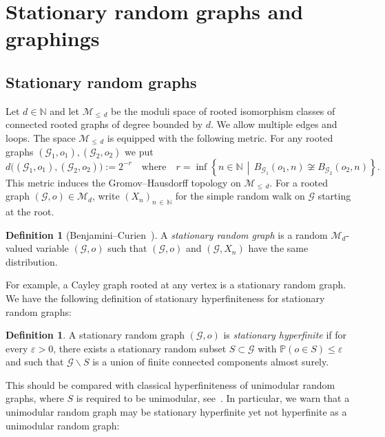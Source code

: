 \documentclass[10pt]{amsart}
\theoremstyle{definition}\newtheorem{defi}[theo]{Definition}\newtheorem{rema}[theo]{Remark}\newtheorem{exam}[theo]{Example}\newtheorem{exem}[theo]{Example}\newtheorem{nota}[theo]{Notation}
\newcommand{\bbN}{\mathbb{N}}
\newcommand{\bbP}{\mathbb{P}}
\newcommand{\calM}{\mathcal{M}}
\newcommand{\calG}{\mathcal{G}}
\begin{document}
\section{Stationary random graphs and graphings}\label{sec:stationary}

\subsection{Stationary random graphs}\label{sec:SRG}

Let $d\in\bbN$ and let $\calM_{\leq\,d}$ be the moduli space of rooted isomorphism classes of connected rooted graphs of degree bounded by $d$. We allow multiple edges and loops. The space $\calM_{\leq\,d}$ is equipped with the following metric. For any rooted graphs $(\calG_1,o_1),(\calG_2,o_2)$ we put
\[
d\big((\calG_1,o_1),(\calG_2,o_2)\big):=2^{-r} \quad\text{where}\quad r=\inf\left\{n\in\bbN \,\middle|\, B_{\calG_1}(o_1,n)\not\cong B_{\calG_2}(o_2,n)\right\}.
\]
This metric induces the Gromov--Hausdorff topology on $\calM_{\leq \,d}$. For a rooted graph $(\calG,o)\in \calM_d$, write $(X_n)_{n\,\in\,\bbN}$ for the simple random walk on $\calG$ starting at the root.

\begin{defi}[{Benjamini--Curien~\cite{BenCur}}]
A \emph{stationary random graph} is a random $\calM_d$-valued variable $(\calG,o)$ such that $(\calG,o)$ and $(\calG,X_n)$ have the same distribution.
\end{defi}


For example, a Cayley graph rooted at any vertex is a stationary random graph. We have the following definition of stationary hyperfiniteness for stationary random graphs:

\begin{defi}
A stationary random graph $(\calG, o)$ is \emph{stationary hyperfinite} if for every $\varepsilon>0$, there exists a stationary random subset $S\subset \calG$ with $\bbP(o\in S)\leq \varepsilon$ and such that $\calG\backslash S$ is a union of finite connected components almost surely.
\end{defi}

This should be compared with classical hyperfiniteness of unimodular random graphs, where $S$ is required to be unimodular, see~\cite{Schramm2011}. In particular, we warn that a unimodular random graph may be stationary hyperfinite yet not hyperfinite as a unimodular random graph:
\end{document}
